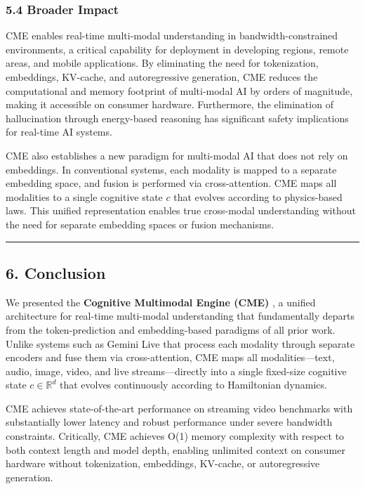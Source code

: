 \documentclass[
  11pt,
  a4paper,
]{article}
\begin{document}
\subsubsection{5.4 Broader Impact}\label{broader-impact}

CME enables real-time multi-modal understanding in bandwidth-constrained
environments, a critical capability for deployment in developing
regions, remote areas, and mobile applications. By eliminating the need
for tokenization, embeddings, KV-cache, and autoregressive generation,
CME reduces the computational and memory footprint of multi-modal AI by
orders of magnitude, making it accessible on consumer hardware.
Furthermore, the elimination of hallucination through energy-based
reasoning has significant safety implications for real-time AI systems.

CME also establishes a new paradigm for multi-modal AI that does not
rely on embeddings. In conventional systems, each modality is mapped to
a separate embedding space, and fusion is performed via cross-attention.
CME maps all modalities to a single cognitive state \(c\) that evolves
according to physics-based laws. This unified representation enables
true cross-modal understanding without the need for separate embedding
spaces or fusion mechanisms.

\begin{center}\rule{0.5\linewidth}{0.5pt}\end{center}

\subsection{6. Conclusion}\label{conclusion}

We presented the \textbf{Cognitive Multimodal Engine (CME)} , a unified
architecture for real-time multi-modal understanding that fundamentally
departs from the token-prediction and embedding-based paradigms of all
prior work. Unlike systems such as Gemini Live that process each
modality through separate encoders and fuse them via cross-attention,
CME maps all modalities---text, audio, image, video, and live
streams---directly into a single fixed-size cognitive state
\(c \in \mathbb{R}^{d}\) that evolves continuously according to
Hamiltonian dynamics.

CME achieves state-of-the-art performance on streaming video benchmarks
with substantially lower latency and robust performance under severe
bandwidth constraints. Critically, CME achieves O(1) memory complexity
with respect to both context length and model depth, enabling unlimited
context on consumer hardware without tokenization, embeddings, KV-cache,
or autoregressive generation.
\end{document}
